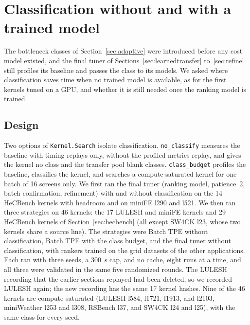 \documentclass[10pt]{article}
\newcommand{\code}[1]{\texttt{#1}}
\begin{document}
\section{Classification without and with a trained model}
\label{sec:coldstart}
The bottleneck classes of Section~\ref{sec:adaptive} were introduced before any
cost model existed, and the final tuner of Sections~\ref{sec:learnedtransfer}
to~\ref{sec:refine} still profiles its baseline and passes the class to its
models. We asked where classification saves time when no trained model is
available, as for the first kernels tuned on a GPU, and whether it is still
needed once the ranking model is trained.

\subsection{Design}
Two options of \code{Kernel.Search} isolate classification.
\code{no\_classify} measures the baseline with timing replays only, without the
profiled metrics replay, and gives the kernel no class and the transfer pool
blank classes. \code{class\_budget} profiles the baseline, classifies the kernel,
and searches a compute-saturated kernel for one batch of 16 screens only. We
first ran the final tuner (ranking model, patience~2, batch confirmation,
refinement) with and without classification on the 14 HeCBench kernels with
headroom and on miniFE l290 and l521. We then ran three strategies on 46
kernels: the 17 LULESH and miniFE kernels and 29 HeCBench kernels of
Section~\ref{sec:hecbench} (all except SW4CK l23, whose two kernels share a source
line). The strategies were Batch TPE without classification, Batch TPE with the
class budget, and the final tuner without classification, with rankers trained
on the grid datasets of the other applications. Each ran with three seeds, a 300~s
cap, and no cache, eight runs at a time, and all three were validated in the
same five randomized rounds. The LULESH recording that the earlier sections
replayed had been deleted, so we recorded LULESH again; the new recording has
the same 17 kernel hashes. Nine of the 46 kernels are compute saturated
(LULESH l584, l1721, l1913, and l2103, miniWeather l253 and l308, RSBench l37,
and SW4CK l24 and l25), with the same class for every seed.
\end{document}
